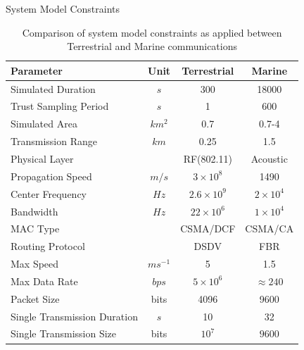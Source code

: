 \documentclass{beamer}
\begin{document}
\begin{frame}[shrink]{System Model Constraints}
\centering
\begin{table}[h]
  \caption{Comparison of system model constraints as applied between Terrestrial and Marine communications
  \hyperlink{scaling}{}
  } \label{tab:sysconstraints}
  \begin{center}
    \setlength{\tabcolsep}{8pt}
    \begin{tabular}{lccc}
      \toprule
      Parameter & Unit & Terrestrial & Marine \\
      \midrule
      Simulated Duration & $s$ & 300 & 18000\\
      Trust Sampling Period & $s$ & 1 & 600 \\
      Simulated Area & $km^2$ & 0.7 & 0.7-4 \\
      Transmission Range & $km$ & 0.25 & 1.5 \\
      Physical Layer & & RF(802.11) & Acoustic\\
      Propagation Speed& $m/s$ & $3\times10^8$ & 1490\\
      Center Frequency& $Hz$ & $2.6\times10^9$ & $2 \times 10^4$ \\
      Bandwidth& $Hz$ & $22\times10^6$ & $1\times10^4$\\
      MAC Type & & CSMA/DCF & CSMA/CA\\
      Routing Protocol & & DSDV & FBR \\
      Max Speed & $ms^{-1}$ & 5 & 1.5 \\
      Max Data Rate & $bps$ & $5\times10^6$ & $\approx 240$ \\
      Packet Size & bits & 4096 &  9600 \\
      Single Transmission Duration & $s$ & 10 & 32 \\
      Single Transmission Size & bits & $10^7$ & $9600$ \\
      \bottomrule
    \end{tabular}
    \setlength{\tabcolsep}{6pt}
  \end{center}
\end{table}

\end{frame}
\end{document}
